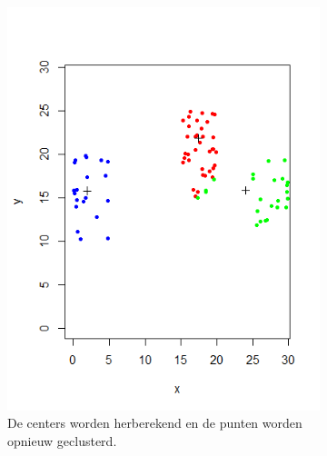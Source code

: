 \documentclass[a4paper,12pt]{article}
\theoremstyle{definition}
\begin{document}
\begin{figure}[!ht]
\begin{subfigure}[t]{0.3\textwidth}
        \includegraphics[width=\textwidth]{kmeans_it2.png}
        \caption{De centers worden herberekend en de punten worden opnieuw geclusterd.}
    \end{subfigure}
    \begin{subfigure}[t]{0.3\textwidth}

\end{subfigure}
\end{figure}
\end{document}
